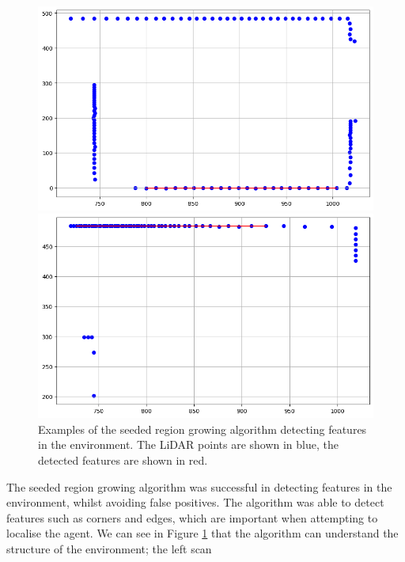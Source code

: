 \documentclass[12pt]{article}
\begin{document}
\begin{figure}[H]
    \centering
    \begin{minipage}{0.45\textwidth}
        \centering
        \includegraphics[width=\linewidth]{FE1}
    \end{minipage}
    \begin{minipage}{0.45\textwidth}
        \centering
        \includegraphics[width=\linewidth]{FE2}
    \end{minipage}
    \caption[Short caption]{Examples of the seeded region growing algorithm detecting features in the environment. The LiDAR
    points are shown in blue, the detected features are shown in red.}
    \label{fig:feature_extraction}
\end{figure}
The seeded region growing algorithm was successful in detecting features in the environment, whilst avoiding false positives.
The algorithm was able to detect features such as corners and edges, which are important when attempting to localise the agent.
We can see in Figure \ref{fig:feature_extraction} that the algorithm can understand the structure of the environment; the left scan
\end{document}
